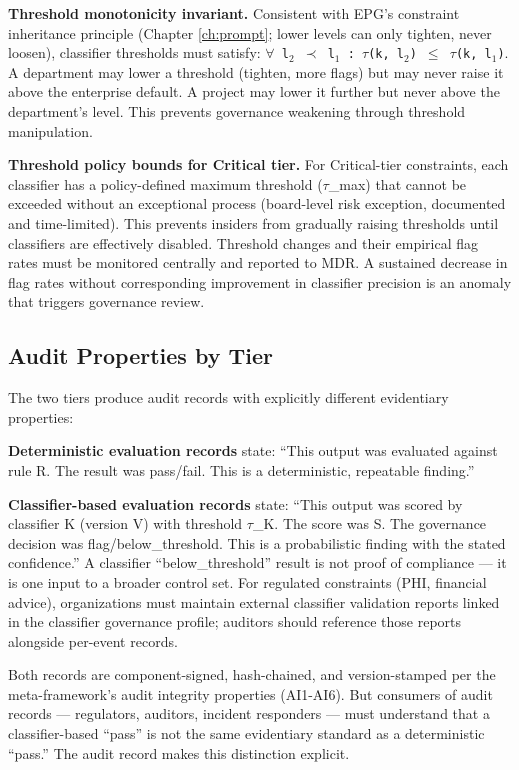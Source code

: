 \textbf{Threshold monotonicity invariant.} Consistent with EPG's constraint inheritance principle (Chapter \ref{ch:prompt}; lower levels can only tighten, never loosen), classifier thresholds must satisfy: \texttt{$\forall$ l$_2$ $\prec$ l$_1$ : $\tau$(k, l$_2$) $\leq$ $\tau$(k, l$_1$)}. A department may lower a threshold (tighten, more flags) but may never raise it above the enterprise default. A project may lower it further but never above the department's level. This prevents governance weakening through threshold manipulation.

\textbf{Threshold policy bounds for Critical tier.} For Critical-tier constraints, each classifier has a policy-defined maximum threshold ($\tau$\_\allowbreak{}max) that cannot be exceeded without an exceptional process (board-level risk exception, documented and time-limited). This prevents insiders from gradually raising thresholds until classifiers are effectively disabled. Threshold changes and their empirical flag rates must be monitored centrally and reported to MDR. A sustained decrease in flag rates without corresponding improvement in classifier precision is an anomaly that triggers governance review.

\subsection{Audit Properties by Tier}


The two tiers produce audit records with explicitly different evidentiary properties:

\textbf{Deterministic evaluation records} state: ``This output was evaluated against rule R. The result was pass/fail. This is a deterministic, repeatable finding.''

\textbf{Classifier-based evaluation records} state: ``This output was scored by classifier K (version V) with threshold $\tau$\_\allowbreak{}K. The score was S. The governance decision was flag/below\_\allowbreak{}threshold. This is a probabilistic finding with the stated confidence.'' A classifier ``below\_\allowbreak{}threshold'' result is not proof of compliance --- it is one input to a broader control set. For regulated constraints (PHI, financial advice), organizations must maintain external classifier validation reports linked in the classifier governance profile; auditors should reference those reports alongside per-event records.

Both records are component-signed, hash-chained, and version-stamped per the meta-framework's audit integrity properties (AI1-AI6). But consumers of audit records --- regulators, auditors, incident responders --- must understand that a classifier-based ``pass'' is not the same evidentiary standard as a deterministic ``pass.'' The audit record makes this distinction explicit.

